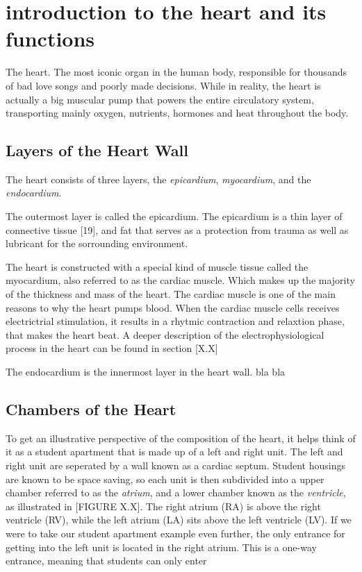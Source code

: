 \section{introduction to the heart and its functions}
The heart. The most iconic organ in the human body, responsible for thousands of bad love songs and poorly made decisions. While in reality, the heart is actually a big muscular pump that powers the entire circulatory system, transporting mainly oxygen, nutrients, hormones and heat throughout the body. 

\subsection{Layers of the Heart Wall}
The heart consists of three layers, the \textit{epicardium}, \textit{myocardium}, and the \textit{endocardium}. 

The outermost layer is called the epicardium. The epicardium is a thin layer of connective tissue [19], and fat that serves as a protection from trauma as well as lubricant for the sorrounding environment. 

The heart is constructed with a special kind of muscle tissue called the myocardium, also referred to as the cardiac muscle. Which makes up the majority of the thickness and mass of the heart. The cardiac muscle is one of the main reasons to why the heart pumps blood. When the cardiac muscle cells receives electrictrial stimulation, it results in a rhytmic contraction and relaxtion phase, that makes the heart beat. A deeper description of the electrophysiological process in the heart can be found in section [X.X]

The endocardium is the innermost layer in the heart wall. bla bla


\subsection{Chambers of the Heart}
To get an illustrative perspective of the composition of the heart, it helps think of it as a student apartment that is made up of a left and right unit. The left and right unit are seperated by a wall known as a cardiac septum. Student housings are known to be space saving, so each unit is then subdivided into a upper chamber referred to as the \textit{atrium}, and a lower chamber known as the \textit{ventricle}, as illustrated in [FIGURE X.X]. The right atrium (RA) is above the right ventricle (RV), while the left atrium (LA) sits above the left ventricle (LV). If we were to take our student apartment example even further, the only entrance for getting into the left unit is located in the right atrium. This is a one-way entrance, meaning that students can only enter 

